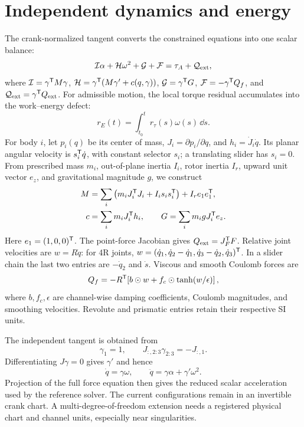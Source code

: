 \documentclass[10pt,twocolumn,letterpaper]{article}
\begin{document}
\section{Independent dynamics and energy}
The crank-normalized tangent converts the constrained equations into one scalar balance:
\begin{equation}
\mathcal I\alpha+\mathcal H\omega^2+\mathcal G+\mathcal F=\tau_A+\mathcal Q_{\rm ext},
\label{eq:reduced}
\end{equation}
where $\mathcal I=\gamma^{\mathsf T} M\gamma$, $\mathcal H=\gamma^{\mathsf T}(M\gamma'+c(q,\gamma))$, $\mathcal G=\gamma^{\mathsf T} G$, $\mathcal F=-\gamma^{\mathsf T} Q_f$, and $\mathcal Q_{\rm ext}=\gamma^{\mathsf T} Q_{\rm ext}$. For admissible motion, the local torque residual accumulates into the work--energy defect:
\begin{equation}
r_E(t)=\int_{t_0}^t r_\tau(s)\omega(s)\,\dd s.
\label{eq:residualpower}
\end{equation}
\label{app:equations}
For body $i$, let $p_i(q)$ be its center of mass, $J_i=\partial p_i/\partial q$, and $h_i=\dot J_i\dot q$. Its planar angular velocity is $s_i^{\mathsf T}\dot q$, with constant selector $s_i$; a translating slider has $s_i=0$. From prescribed mass $m_i$, out-of-plane inertia $I_i$, rotor inertia $I_r$, upward unit vector $e_z$, and gravitational magnitude $g$, we construct
\begin{align}
M&=\sum_i\left(m_iJ_i^{\mathsf T} J_i+I_i s_i s_i^{\mathsf T}\right)+I_r e_1e_1^{\mathsf T},\\
c&=\sum_i m_iJ_i^{\mathsf T} h_i,\qquad
G=\sum_i m_i gJ_i^{\mathsf T} e_z.
\label{eq:bodydynamics}
\end{align}
Here $e_1=(1,0,0)^{\mathsf T}$. The point-force Jacobian gives $Q_{\rm ext}=J_F^{\mathsf T} F$. Relative joint velocities are $w=R\dot q$: for 4R joints, $w=(\dot q_1,\dot q_2-\dot q_1,\dot q_3-\dot q_2,\dot q_3)^{\mathsf T}$. In a slider chain the last two entries are $-\dot q_2$ and $\dot s$. Viscous and smooth Coulomb forces are
\begin{equation}
Q_f=-R^{\mathsf T}\!\left[b\odot w+f_c\odot\tanh(w/\epsilon)\right],
\label{eq:friction}
\end{equation}
where $b,f_c,\epsilon$ are channel-wise damping coefficients, Coulomb magnitudes, and smoothing velocities. Revolute and prismatic entries retain their respective SI units.


The independent tangent is obtained from
\begin{equation}
\gamma_1=1,\qquad
J_{:,2:3}\gamma_{2:3}=-J_{:,1}.
\end{equation}
Differentiating $J\gamma=0$ gives $\gamma'$ and hence
\begin{equation}
\dot q=\gamma\omega,\qquad
\ddot q=\gamma\alpha+\gamma'\omega^2.
\end{equation}
Projection of the full force equation then gives the reduced scalar acceleration used by the reference solver. The current configurations remain in an invertible crank chart. A multi-degree-of-freedom extension needs a registered physical chart and channel units, especially near singularities.
\end{document}
